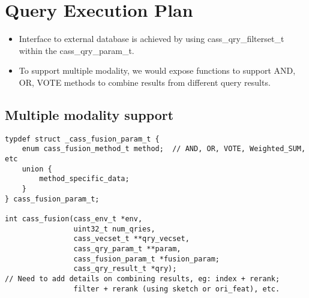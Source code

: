 %       
% 
% 
% 
\section{Query Execution Plan}

\begin{itemize}
\item Interface to external database is achieved by using
cass\_qry\_filterset\_t within the cass\_qry\_param\_t.
\item To support multiple modality, we would expose functions to
  support AND, OR, VOTE methods to combine results from different
  query results.
\end{itemize}

\subsection {Multiple modality support}
\begin{verbatim}
typdef struct _cass_fusion_param_t {
    enum cass_fusion_method_t method;  // AND, OR, VOTE, Weighted_SUM, etc
    union {
        method_specific_data;
    }
} cass_fusion_param_t;

int cass_fusion(cass_env_t *env, 
                uint32_t num_qries,
                cass_vecset_t **qry_vecset, 
                cass_qry_param_t **param, 
                cass_fusion_param_t *fusion_param;
                cass_qry_result_t *qry);
// Need to add details on combining results, eg: index + rerank;
                filter + rerank (using sketch or ori_feat), etc.
\end{verbatim}


